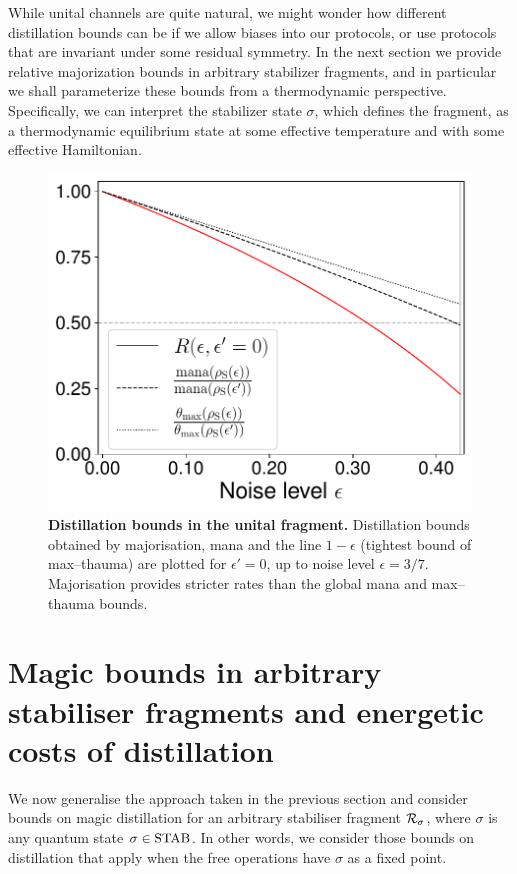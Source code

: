 \documentclass[pra,
aps,
twocolumn,
superscriptaddress,
groupedaddress,
nofootinbib,
reprint
]{revtex4-1}
\begin{document}
While unital channels are quite natural, we might wonder how different distillation bounds can be if we allow biases into our protocols, or use protocols that are invariant under some residual symmetry. In the next section we provide relative majorization bounds in arbitrary stabilizer fragments, and in particular we shall parameterize these bounds from a thermodynamic perspective. Specifically, we can interpret the stabilizer state $\sigma$, which defines the fragment, as a thermodynamic equilibrium state at some effective temperature and with some effective Hamiltonian.
\begin{figure}[t]
    \centering
    \includegraphics[scale=0.45]{figs/distill_bounds.pdf}
    \caption{\textbf{Distillation bounds in the unital fragment.} Distillation bounds obtained by majorisation, mana and the line $1-\epsilon$ (tightest bound of max--thauma) are plotted for $\epsilon' = 0$, up to noise level $\epsilon = 3/7$.
    Majorisation provides stricter rates than the global mana and max--thauma bounds.
    }
    \label{fig:distill_bounds}
\end{figure}

\section{Magic bounds in arbitrary stabiliser fragments and energetic costs of distillation}
\label{sec:stab}

We now generalise the approach taken in the previous section and consider bounds on magic distillation for an arbitrary stabiliser fragment $\mathcal{R}_\sigma$, where $\sigma$ is any quantum state $\sigma \in {\rm{STAB}}$.
In other words, we consider those bounds on distillation that apply when the free operations have $\sigma$ as a fixed point.
\end{document}
